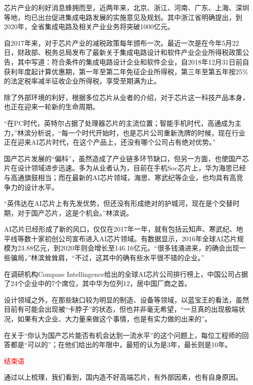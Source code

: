 \documentclass[utf8]{book}
\begin{document}
	芯片产业的利好消息蜂拥而至，近两年来，北京、浙江、河南、广东、上海、深圳等地，均已出台促进集成电路发展的实施意见及规划。其中浙江省明确提出，到2020年，全省集成电路及相关产业业务将突破1000亿元。
	
	自2017年来，对于芯片产业的减税政策每年颁布一次。最近一次是在今年5月22日，财政部、税务总局发布了最新关于集成电路设计和软件产业企业所得税政策公告，其中写道：符合条件的集成电路设计企业和软件企业，自2018年12月31日前自获利年度起计算优惠期，第一年至第二年免征企业所得税，第三年至第五年按25\%的法定税率减半征收企业所得税，享受至期满为止。
	
	除了外部环境的利好，根据多位芯片从业者的介绍，对于芯片这一科技产品本身，也正在迎来一轮新的生命周期。
	
	“在PC时代，英特尔占据了处理器芯片的主流位置；智能手机时代，高通成为主力，”林滨分析说，“每一个时代开始时，也是芯片公司重新洗牌的时候，现在行业正在迎来AI芯片时代，在这个产品上，还没有哪个公司占有绝对优势。”
	
	国产芯片发展的“偏科”，虽然造成了产业链多环节缺口，但另一方面，也使国产芯片在设计领域进步迅速。多为从业者认为，目前在手机Soc芯片上，华为海思已经与高通旗鼓相当；而在最新的AI芯片领域，海思、寒武纪等企业，也均具有高竞争力的设计水平。
	
	“英伟达在AI芯片上有先发优势，但还没有形成绝对的护城河，现在是个交替时期，对于国产芯片，这是个机会。”林滨说。
	
	AI芯片已经形成了新的风口，仅仅在2017年一年，就有包括云知声、寒武纪、地平线等数十家初创公司宣布进入AI芯片领域。有数据显示，2016年全球AI芯片规模为23.88亿元，到2020年则会增长至146.16亿元。“很多钱涌进来，的确会出现一些骗局，”林滨耸耸肩，“不过，这其中的确有些水平很不错的企业。”
	
	在调研机构Compass Intellingence给出的全球AI芯片公司排行榜上，中国公司占据了24个企业中的7个席位，其中华为位列12，居中国厂商之首。
	
	设计领域之外，在那些缺口较为明显的制造、设备等领域，以蓝宝王的看法，虽然目前有可能会出现被“卡脖子”的状态，但也并非毫无希望，“一旦真的出现极端状况，如果有大企业、大力量来做这个事情，也是有实力做的出来的”。
	
	在关于“你认为国产芯片能否有机会达到一流水平”的这个问题上，每位工程师的回答都是“可以的”；在他们给出的年限中，最短的认为是3年，最长则是10年。
	
	
	\begin{center}
		{\Large  \textcolor{red}{结束语}}
	\end{center}
	
	
	通过以上梳理，我们看到，国内造不好高端芯片，有外部因素，也有自身原因。
	
\end{document}
